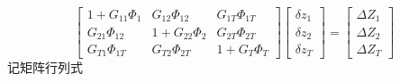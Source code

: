 \begin{equation}
\label{eq:42}
\left[ {\begin{array}{*{20}{c}}
  {1 + {G_{11}}{\Phi _1}}&{{G_{12}}{\Phi _{12}}}&{{G_{1T}}{\Phi _{1T}}} \\ 
  {{G_{21}}{\Phi _{12}}}&{1 + {G_{22}}{\Phi _2}}&{{G_{2T}}{\Phi _{2T}}} \\ 
  {{G_{T1}}{\Phi _{1T}}}&{{G_{T2}}{\Phi _{2T}}}&{1 + {G_T}{\Phi _T}} 
\end{array}} \right]
\begin{bmatrix}
  {\delta z_1} \\
  {\delta z_2} \\
  {\delta z_T}
\end{bmatrix}
=
\begin{bmatrix}
  {\Delta {Z_1}} \\
  {\Delta {Z_2}} \\
  {\Delta {Z_T}}
\end{bmatrix}
\end{equation}
记矩阵行列式

